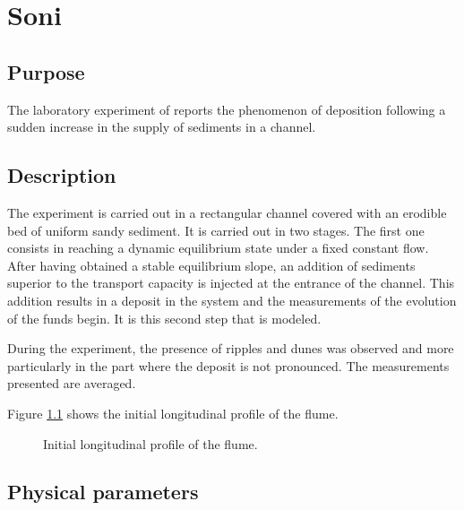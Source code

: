 \chapter{Soni}\label{chapter:Newton}

\section{Purpose}

The laboratory experiment of \cite{soni1981laboratory} 
reports the phenomenon of deposition
following a sudden increase in the supply of sediments in a channel.

\section{Description}

The experiment is carried out in a rectangular channel covered with
an erodible bed of uniform sandy sediment. It is carried out in two
stages. The first one consists in reaching a dynamic equilibrium 
state under a fixed constant flow. After having obtained a stable 
equilibrium slope, an addition of sediments superior to the transport 
capacity is injected at the entrance of the channel. This addition 
results in a deposit in the system and the measurements of the 
evolution of the funds begin. It is this second step that is modeled.

During the experiment, the presence of ripples and dunes was observed
and more particularly in the part where the deposit is not pronounced. 
The measurements presented are averaged. 

Figure \ref{soni:fig:initial} shows the initial longitudinal
profile of the flume.

\begin{figure}[h]
 \centering
 \caption{Initial longitudinal profile of the flume.}
 \label{soni:fig:initial}
\end{figure}

\section{Physical parameters}


